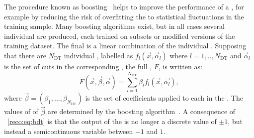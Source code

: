 The procedure known as boosting~\cite{friedman2001} helps to improve the performance of a \DT, for example by reducing the risk of overfitting the \DT to statistical fluctuations in the training sample. Many boosting algorithms exist, but in all cases several individual \DT\s are produced, each trained on subsets or modified versions of the training dataset. The final \BDT is a linear combination of the individual \DT\s. Supposing that there are $N_{\textrm{DT}}$ individual \DT\s, labelled as $f_{l}(\vec{x},\vec{\alpha}_{l})$ where $l=1,..,N_{\textrm{DT}}$ and $\vec{\alpha}_{l}$ is the set of cuts in the corresponding \DT, the full \BDT, $F$, is written as:
\begin{equation}
\label{reco:eq:bdt}
F(\vec{x},\vec{\beta},\vec{\alpha}) = \sum_{l=1}^{N_{\textrm{DT}}} \beta_{l} f_{l}(\vec{x},\vec{\alpha_{l}}), 
\end{equation}
where $\vec{\beta}=(\beta_{1},...,\beta_{N_{\textrm{DT}}})$ is the set of coefficients applied to each \DT in the \BDT. The values of of $\vec{\beta}$ are determined by the boosting algorithm~\cite{friedman2009,TMVA}. A consequence of \Eq~\ref{reco:eq:bdt} is that the output of the \BDT is no longer a discrete value of $\pm1$, but instead a semicontinuous variable between $-1$ and $1$. 




